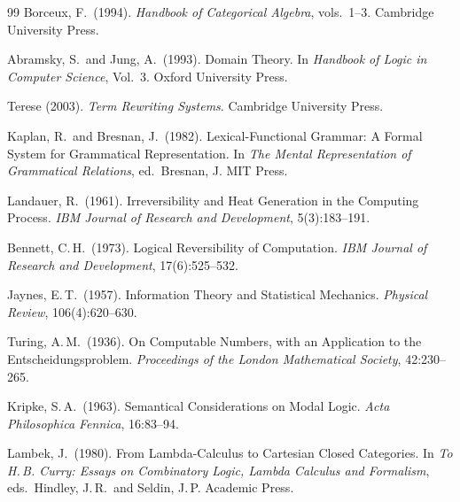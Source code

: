 \documentclass[12pt, oneside]{amsbook}
\theoremstyle{plain}
\theoremstyle{definition}
\theoremstyle{remark}
\begin{document}
\begin{thebibliography}{99}
Borceux, F.\ (1994).
\textit{Handbook of Categorical Algebra}, vols.\ 1--3.
Cambridge University Press.

Abramsky, S.\ and Jung, A.\ (1993).
Domain Theory.
In \textit{Handbook of Logic in Computer Science}, Vol.\ 3.
Oxford University Press.


Terese (2003).
\textit{Term Rewriting Systems}.
Cambridge University Press.


Kaplan, R.\ and Bresnan, J.\ (1982).
Lexical-Functional Grammar: A Formal System for Grammatical Representation.
In \textit{The Mental Representation of Grammatical Relations},
ed.\ Bresnan, J. MIT Press.


Landauer, R.\ (1961).
Irreversibility and Heat Generation in the Computing Process.
\textit{IBM Journal of Research and Development}, 5(3):183--191.

Bennett, C.\,H.\ (1973).
Logical Reversibility of Computation.
\textit{IBM Journal of Research and Development}, 17(6):525--532.

Jaynes, E.\,T.\ (1957).
Information Theory and Statistical Mechanics.
\textit{Physical Review}, 106(4):620--630.


Turing, A.\,M.\ (1936).
On Computable Numbers, with an Application to the Entscheidungsproblem.
\textit{Proceedings of the London Mathematical Society}, 42:230--265.

Kripke, S.\,A.\ (1963).
Semantical Considerations on Modal Logic.
\textit{Acta Philosophica Fennica}, 16:83--94.

Lambek, J.\ (1980).
From Lambda-Calculus to Cartesian Closed Categories.
In \textit{To H.\,B. Curry: Essays on Combinatory Logic, Lambda Calculus and
Formalism}, eds.\ Hindley, J.\,R.\ and Seldin, J.\,P.
Academic Press.

\end{thebibliography}

\end{document}
